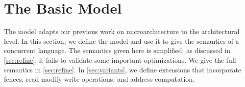 \section{The Basic Model}
\label{sec:model}

The model adapts our previous work on microarchitecture \cite{2019-sp} to the
architectural level.  In this section, we define the model and use it to give
the semantics of a concurrent language.  The semantics given here is
simplified: as discussed in \textsection\ref{sec:refine}, it fails to
validate some important optimizations.  We give the full semantics in
\textsection\ref{sec:refine}.  In \textsection\ref{sec:variants}, we define
extensions that incorporate fences, read-modify-write operations, and address
computation.

\begin{comment}
https://preshing.com/20131125/acquire-and-release-fences-dont-work-the-way-youd-expect/

Cannot encode R/A actions with actions+fences...

A release operation prevents preceding memory operations from being delayed
past it (a;Rel =/=> Rel;a)
 
A release fence prevents preceding memory operations from being delayed past
subsequent writes (a;FR;w =/=> w;a;FR)

An acquire operation prevents subsequent memory operations from being advanced
before it (Acq;a =/=> a;Acq)

An acquire fence prevents subsequent memory operations from being advanced
before prior reads (r;FA;a =/=> FA;a;r)

https://www.modernescpp.com/index.php/fences-as-memory-barriers

StoreLoad: Full fence allows a store before to be reordered with respect to a
load after (wx;F;ry) ===> (ry;F;wx)

StoreLoad+LoadLoad: Release fence also allows (rx;FR;ry) ===> (ry;FR;rx)

StoreLoad+StoreStore: Acquire fence also allows (wx;FR;wy) ===> (wy;FR;wx)

LoadStore: No fence allows a prior load to reorder w.r.t. a subsequent store
(rx;FR;wy) =/=> (wy;FR;rx)

https://preshing.com/20120710/memory-barriers-are-like-source-control-operations/
Good news is that a fullFence does it.

Bizarrely, it seems this is not supported in C++... You have to go to assembly.
\end{comment}

